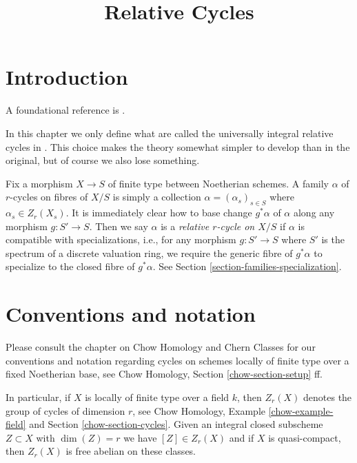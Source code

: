 

%


\title{Relative Cycles}


\maketitle

\label{section-phantom}

\tableofcontents



\section{Introduction}
\label{section-introduction}

\noindent
A foundational reference is \cite{SV}.

\medskip\noindent
In this chapter we only define what are called the universally integral
relative cycles in \cite{SV}. This choice makes the theory somewhat
simpler to develop than in the original, but of course we also lose something.

\medskip\noindent
Fix a morphism $X \to S$ of finite type 
between Noetherian schemes. A family $\alpha$ of $r$-cycles on fibres
of $X/S$ is simply a collection $\alpha = (\alpha_s)_{s \in S}$
where $\alpha_s \in Z_r(X_s)$. It is immediately clear how to
base change $g^*\alpha$ of $\alpha$ along any morphism $g : S' \to S$.
Then we say $\alpha$ is a {\it relative $r$-cycle on $X/S$}
if $\alpha$ is compatible with specializations, i.e., for any
morphism $g : S' \to S$ where $S'$ is the spectrum of a discrete
valuation ring, we require the generic fibre of $g^*\alpha$
to specialize to the closed fibre of $g^*\alpha$.
See Section \ref{section-families-specialization}.






\section{Conventions and notation}
\label{section-conventions}

\noindent
Please consult the chapter on Chow Homology and Chern Classes
for our conventions and notation regarding cycles on schemes
locally of finite type over a fixed Noetherian base, see
Chow Homology, Section \ref{chow-section-setup} ff.

\medskip\noindent
In particular, if $X$ is locally of finite type over a field $k$,
then $Z_r(X)$ denotes the group of cycles of dimension $r$, see
Chow Homology, Example \ref{chow-example-field} and
Section \ref{chow-section-cycles}. Given an integral closed
subscheme $Z \subset X$ with $\dim(Z) = r$ we have $[Z] \in Z_r(X)$
and if $X$ is quasi-compact, then $Z_r(X)$ is free abelian on these classes.




